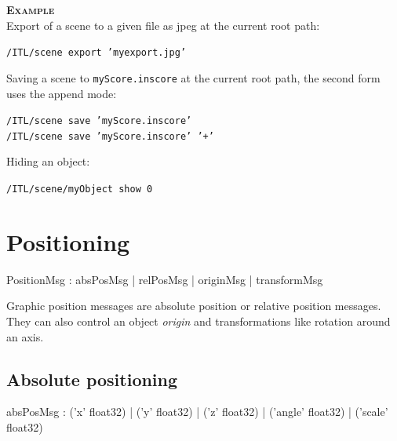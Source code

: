 \documentclass[a4paper,twoside]{report}
\newcommand{\sublevel}[1]	{\section{#1}}
\newcommand{\subsublevel}[1]	{\subsection{#1}}
\newcommand{\OSC}[1]		{\texttt{#1}}
\newcommand{\example}		{\textbf{\hspace{-1.5cm}\textbf{\textsc{Example }}}}
\newcommand{\sample}	[1]			{\vspace{-2mm}\begin{center}\colorbox{mygrey}{
								\begin{minipage}[t]{0.9\columnwidth} 
								{\small \texttt{#1}}
								\end{minipage}}\end{center}}
\begin{document}
\example \\
Export of a scene to a given file as jpeg at the current root path:
\sample{/ITL/scene export 'myexport.jpg'}
Saving a scene to \OSC{myScore.inscore} at the current root path, the second form uses the append mode:
\sample{/ITL/scene save 'myScore.inscore'\\
/ITL/scene save 'myScore.inscore' '+'}
Hiding an object:
\sample{/ITL/scene/myObject show 0}

\sublevel{Positioning}

\begin{rail}
PositionMsg : 		absPosMsg 
				|	relPosMsg 
				|	originMsg 
				| 	transformMsg
\end{rail}

Graphic position messages are absolute position or relative position messages. They can also control an object \emph{origin} and transformations like rotation around an axis.

\subsublevel{Absolute positioning}

\begin{rail}
absPosMsg :  
			('x' float32)
		| 	('y' float32)
		| 	('z' float32)
		| 	('angle' float32)
		| 	('scale' float32) 
\end{rail}
\end{document}
